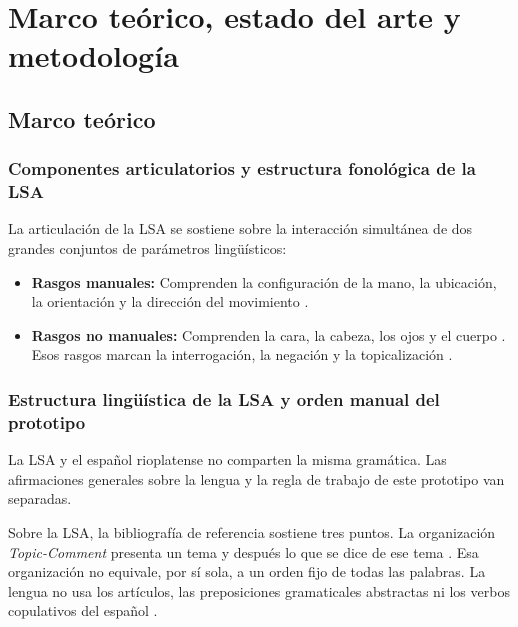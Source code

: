 \chapter{Marco teórico, estado del arte y metodología}
\label{cap:marco_teorico}

\section{Marco teórico}

\subsection{Componentes articulatorios y estructura fonológica de la LSA}
La articulación de la LSA se sostiene sobre la interacción simultánea de dos grandes conjuntos de parámetros lingüísticos:

\begin{itemize}
    \item \textbf{Rasgos manuales:} Comprenden la configuración de la mano, la ubicación, la orientación y la dirección del movimiento \parencite[43]{massone2012parte2}.
    \item \textbf{Rasgos no manuales:} Comprenden la cara, la cabeza, los ojos y el cuerpo \parencite[43]{massone2012parte2}. Esos rasgos marcan la interrogación, la negación y la topicalización \parencite[12, 30]{massone2012parte2}.
\end{itemize}

\subsection{Estructura lingüística de la LSA y orden manual del prototipo}
\label{sec:orden_prototipo}
La LSA y el español rioplatense no comparten la misma gramática. Las afirmaciones generales sobre la lengua y la regla de trabajo de este prototipo van separadas.

Sobre la LSA, la bibliografía de referencia sostiene tres puntos. La organización \textit{Topic-Comment} presenta un tema y después lo que se dice de ese tema \parencite[30]{massone2012parte2}. Esa organización no equivale, por sí sola, a un orden fijo de todas las palabras. La lengua no usa los artículos, las preposiciones gramaticales abstractas ni los verbos copulativos del español \parencite{massone1993numero}.

